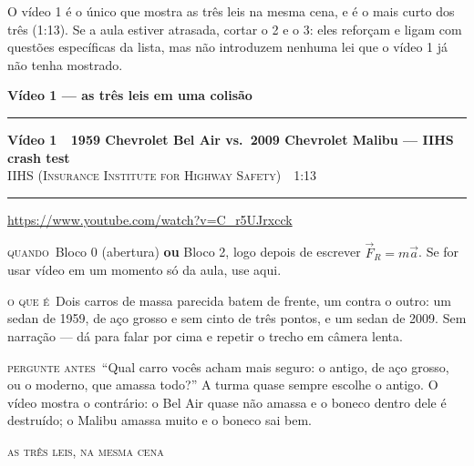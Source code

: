 \documentclass[11pt,a4paper]{article}
\newcommand{\secao}[1]{%
  \needspace{7\baselineskip}
  \vspace{1.8em}
  {\Large\bfseries #1}\\[-0.55em]
  {\color{black!30}\rule{\linewidth}{0.5pt}}
  \par\nobreak\smallskip
}
\newcommand{\video}[5]{%
  \needspace{8\baselineskip}
  \par\addvspace{1.4em}
  {\large\bfseries\color{vinho}V\'ideo #1 \,\textemdash\, #2}\\[0.1em]
  {\small\scshape\color{grafite}#3 \,\textperiodcentered\, #4}\\[-0.5em]
  {\color{black!25}\rule{\linewidth}{0.4pt}}
  \par\nobreak\smallskip
  {\small\url{#5}}
  \par\smallskip
}
\newcommand{\campo}[2]{%
  \par{\small\scshape\color{vinho}#1}\ #2\par}
\begin{document}
\vspace{0.6em}

\begin{aviso}
O v\'ideo 1 \'e o \'unico que mostra as tr\^es leis na mesma cena, e \'e
o mais curto dos tr\^es (1:13). Se a aula estiver atrasada, cortar o 2 e
o 3: eles refor\c{c}am e ligam com quest\~oes espec\'ificas da lista,
mas n\~ao introduzem nenhuma lei que o v\'ideo 1 j\'a n\~ao tenha
mostrado.
\end{aviso}

\newpage

\secao{V\'ideo 1 --- as tr\^es leis em uma colis\~ao}

\video{1}{1959 Chevrolet Bel Air vs.\ 2009 Chevrolet Malibu --- IIHS
crash test}{IIHS (Insurance Institute for Highway
Safety)}{1:13}{https://www.youtube.com/watch?v=C_r5UJrxcck}

\campo{quando}{Bloco 0 (abertura) \textbf{ou} Bloco 2, logo depois de
escrever $\vec{F}_R = m\vec{a}$. Se for usar v\'ideo em um momento s\'o
da aula, use aqui.}

\campo{o que \'e}{Dois carros de massa parecida batem de frente, um
contra o outro: um sedan de 1959, de a\c{c}o grosso e sem cinto de
tr\^es pontos, e um sedan de 2009. Sem narra\c{c}\~ao --- d\'a para
falar por cima e repetir o trecho em c\^amera lenta.}

\campo{pergunte antes}{``Qual carro voc\^es acham mais seguro: o antigo,
de a\c{c}o grosso, ou o moderno, que amassa todo?'' A turma quase sempre
escolhe o antigo. O v\'ideo mostra o contr\'ario: o Bel Air quase n\~ao
amassa e o boneco dentro dele \'e destru\'ido; o Malibu amassa muito e o
boneco sai bem.}

\campo{as tr\^es leis, na mesma cena}{}
\end{document}
